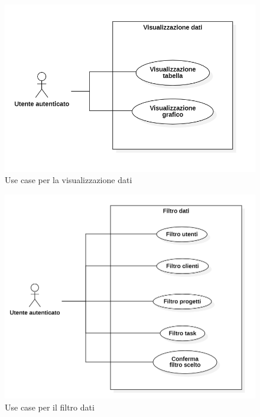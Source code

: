 \begin{figure}[bp!]
	\includegraphics[width = \textwidth*\real{0.7}]{immagini/usecase/visualizzazione_dati.png}
	\caption{Use case per la visualizzazione dati}
	\label{fig:uc_vis_dati}
\end{figure}

\begin{figure}[bp!]
	\includegraphics[width = \textwidth*\real{0.7}]{immagini/usecase/filtro_dati.png}
	\caption{Use case per il filtro dati}
	\label{fig:uc_filtro}
\end{figure}

